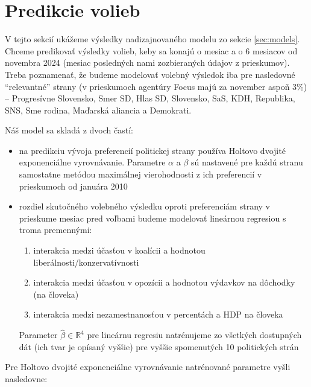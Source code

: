 \documentclass[main.tex]{subfiles}
\begin{document}
	
\section{Predikcie volieb}	

V tejto sekcií ukážeme výsledky nadizajnovaného modelu zo sekcie \ref{sec:models}. Chceme predikovať výsledky volieb, keby sa konajú o mesiac a o 6 mesiacov od novembra 2024 (mesiac posledných nami zozbieraných údajov z prieskumov). Treba poznamenať, že budeme modelovať volebný výsledok iba pre nasledovné \enquote{relevantné} strany (v prieskumoch agentúry Focus majú za november aspoň 3\%) --  Progresívne Slovensko, Smer SD, Hlas SD, Slovensko, SaS, KDH, Republika, SNS, Sme rodina, Maďarská aliancia a Demokrati.

Náš model sa skladá z dvoch častí:


\begin{itemize}
	\item na predikciu vývoja preferencií politickej strany používa Holtovo dvojité exponenciálne vyrovnávanie. Parametre $\alpha$ a $\beta$ sú nastavené pre každú stranu samostatne metódou maximálnej vierohodnosti z ich preferencií v prieskumoch od januára 2010 \\
	\item rozdiel skutočného volebného výsledku oproti preferenciám strany v prieskume mesiac pred voľbami budeme modelovať lineárnou regresiou s troma premennými:
	\begin{enumerate}
		\item interakcia medzi účasťou v koalícii a hodnotou liberálnosti/konzervatívnosti
		\item interakcia medzi účasťou v opozícii a hodnotou výdavkov na dôchodky (na človeka)
		\item interakcia medzi nezamestnanosťou v percentách a HDP na človeka
	\end{enumerate}
	Parameter $\hat{\beta} \in \mathbb{R}^4$ pre lineárnu regresiu natrénujeme zo všetkých dostupných dát (ich tvar je opísaný vyššie) pre vyššie spomenutých 10 politických strán
\end{itemize}

Pre Holtovo dvojité exponenciálne vyrovnávanie natrénované parametre vyšli nasledovne:
\end{document}
